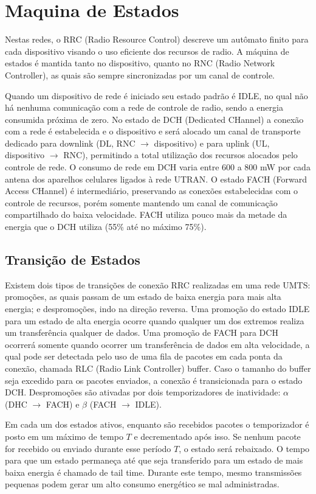 \documentclass{article}
\begin{document}
\section{Maquina de Estados}
Nestas redes, o RRC (Radio Resource Control) descreve um autômato finito para cada dispositivo visando o uso eficiente
dos recursos de radio. A máquina de estados é mantida tanto no dispositivo, quanto no RNC (Radio Network Controller), as
quais são sempre sincronizadas por um canal de controle. 

Quando um dispositivo de rede é iniciado seu estado padrão é IDLE, no qual não há nenhuma comunicação com a rede de
controle de radio, sendo a energia consumida próxima de zero. No estado de DCH (Dedicated CHannel) a conexão com a rede é estabelecida e o
dispositivo e será alocado um canal de transporte dedicado para downlink (DL, RNC $\rightarrow$ dispositivo) e para
uplink (UL, dispositivo $\rightarrow$ RNC), permitindo a total utilização dos recursos alocados pelo controle de rede. O
consumo de rede em DCH varia entre 600 a 800 mW por cada antena dos aparelhos celulares ligados à rede UTRAN. O estado FACH (Forward Access CHannel) é intermediário, preservando as conexões estabelecidas
com o controle de recursos, porém somente mantendo um canal de comunicação compartilhado do baixa velocidade. FACH
utiliza pouco mais da metade da energia que o DCH utiliza (55\% até no máximo 75\%).

\subsection{Transição de Estados}
Existem dois tipos de transições de conexão RRC realizadas em uma rede UMTS: promoções, as quais passam de um estado de
baixa energia para mais alta energia; e despromoções, indo na direção reversa. Uma promoção do estado IDLE para um
estado de alta energia ocorre quando qualquer um dos extremos realiza um transferência qualquer de dados. Uma promoção
de FACH para DCH ocorrerá somente quando ocorrer um transferência de dados em alta velocidade, a qual pode ser
detectada pelo uso de uma fila de pacotes em cada ponta da conexão, chamada RLC (Radio Link Controller) buffer. Caso o
tamanho do buffer seja excedido para os pacotes enviados, a conexão é transicionada para o estado DCH. Despromoções são
ativadas por dois temporizadores de inatividade: $\alpha$ (DHC $\rightarrow$ FACH) e $\beta$ (FACH $\rightarrow$ IDLE).

Em cada um dos estados ativos, enquanto são recebidos pacotes o temporizador é posto em um máximo de tempo $T$ e
decrementado após isso. Se nenhum pacote for recebido ou enviado durante esse período $T$, o estado será rebaixado. O
tempo para que um estado permaneça até que seja transferido para um estado de mais baixa energia é chamado de tail time.
Durante este tempo, mesmo transmissões pequenas podem gerar um alto consumo energético se mal administradas.
\end{document}
